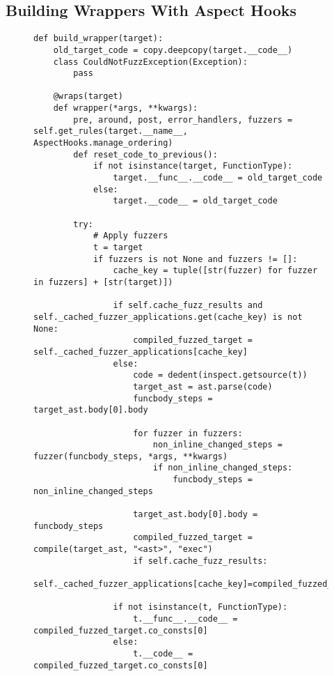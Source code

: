 \subsection{Building Wrappers With Aspect Hooks}
\label{building_aspect_Hook_wrappers}

\begin{figure}
    \centering
    \begin{lstlisting}[style=footnotesize_python]
def build_wrapper(target):
    old_target_code = copy.deepcopy(target.__code__)
    class CouldNotFuzzException(Exception):
        pass

    @wraps(target)
    def wrapper(*args, **kwargs):
        pre, around, post, error_handlers, fuzzers = self.get_rules(target.__name__, AspectHooks.manage_ordering)
        def reset_code_to_previous():
            if not isinstance(target, FunctionType):
                target.__func__.__code__ = old_target_code
            else:
                target.__code__ = old_target_code

        try:
            # Apply fuzzers
            t = target
            if fuzzers is not None and fuzzers != []:
                cache_key = tuple([str(fuzzer) for fuzzer in fuzzers] + [str(target)])

                if self.cache_fuzz_results and self._cached_fuzzer_applications.get(cache_key) is not None:
                    compiled_fuzzed_target = self._cached_fuzzer_applications[cache_key]
                else:
                    code = dedent(inspect.getsource(t))
                    target_ast = ast.parse(code)
                    funcbody_steps = target_ast.body[0].body

                    for fuzzer in fuzzers:
                        non_inline_changed_steps = fuzzer(funcbody_steps, *args, **kwargs)
                        if non_inline_changed_steps:
                            funcbody_steps = non_inline_changed_steps

                    target_ast.body[0].body = funcbody_steps
                    compiled_fuzzed_target = compile(target_ast, "<ast>", "exec")
                    if self.cache_fuzz_results:
                        self._cached_fuzzer_applications[cache_key]=compiled_fuzzed_target

                if not isinstance(t, FunctionType):
                    t.__func__.__code__ =  compiled_fuzzed_target.co_consts[0]
                else:
                    t.__code__ = compiled_fuzzed_target.co_consts[0]


\end{lstlisting}
\end{figure}
